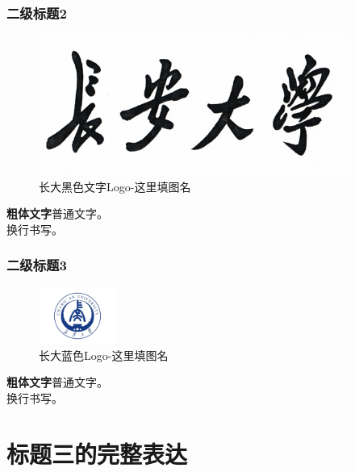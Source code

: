 \documentclass[10pt,aspectratio=169,mathserif]{beamer}
\begin{document}
	\begin{frame}
		\frametitle{\textbf{二级标题2}}
		\begin{figure}[!t]
			\centering
			\includegraphics[width=4in]{figures/D_logo.jpg}
			\caption{长大黑色文字Logo-这里填图名}
			\label{figure2}
		\end{figure}
		\textbf{粗体文字}普通文字。\\
		换行书写。
	\end{frame}
	
	\begin{frame}
		\frametitle{\textbf{二级标题3}}
		\begin{figure}[!t]
			\centering
			\includegraphics[width=1in]{figures/B_logo.jpg}
			\caption{长大蓝色Logo-这里填图名}
			\label{figure3}
		\end{figure}
		\textbf{粗体文字}普通文字。\\
		换行书写。
	\end{frame}
\section[标题三]{标题三的完整表达}
\end{document}
